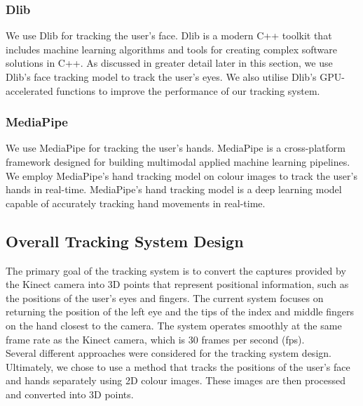 \subsubsection{Dlib}

We use Dlib \cite{dlib09} for tracking the user's face. Dlib is a modern C++ toolkit that includes machine learning algorithms and tools for creating complex software solutions in C++. As discussed in greater detail later in this section, we use Dlib's face tracking model to track the user's eyes. We also utilise Dlib's GPU-accelerated functions to improve the performance of our tracking system.

\subsubsection{MediaPipe}

We use MediaPipe \cite{lugaresi2019mediapipe} for tracking the user's hands. MediaPipe is a cross-platform framework designed for building multimodal applied machine learning pipelines. We employ MediaPipe's hand tracking model on colour images to track the user's hands in real-time. MediaPipe's hand tracking model is a deep learning model capable of accurately tracking hand movements in real-time.



\subsection{Overall Tracking System Design}

The primary goal of the tracking system is to convert the captures provided by the Kinect camera into 3D points that represent positional information, such as the positions of the user's eyes and fingers. The current system focuses on returning the position of the left eye and the tips of the index and middle fingers on the hand closest to the camera. The system operates smoothly at the same frame rate as the Kinect camera, which is 30 frames per second (fps). \\

Several different approaches were considered for the tracking system design. Ultimately, we chose to use a method that tracks the positions of the user's face and hands separately using 2D colour images. These images are then processed and converted into 3D points. \\

